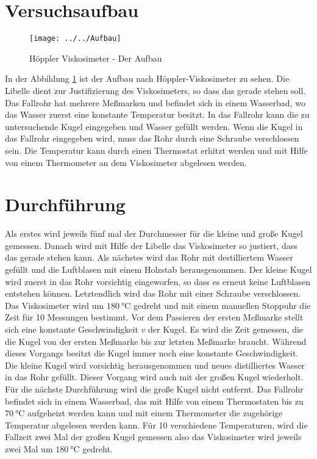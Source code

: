 \section{Versuchsaufbau}
\begin{figure}
	\centering
	\texttt{[image: ../../Aufbau]}
	\caption{Höppler Viskosimeter - Der Aufbau}
	\label{fig:aufbau}
\end{figure}
In der Abbildung \ref{fig:aufbau} ist der Aufbau nach Höppler-Viskosimeter zu sehen. Die Libelle dient zur Justifizierung des Viskosimeters, so dass das gerade stehen soll. Das Fallrohr hat mehrere Meßmarken und befindet sich in einem Wasserbad, wo das Wasser zuerst eine konstante Temperatur besitzt. In das Fallrohr kann die zu untersuchende Kugel eingegeben und Wasser gefüllt werden. Wenn die Kugel in das Fallrohr eingegeben wird, muss das Rohr durch eine Schraube verschlossen sein. Die Temperatur kann durch einen Thermostat erhitzt werden und mit Hilfe von einem Thermometer an dem Viskosimeter abgelesen werden.
\section{Durchführung}
\label{sec:Durchführung}
Als erstes wird jeweils fünf mal der Durchmesser für die kleine und große Kugel gemessen. Danach wird mit Hilfe der Libelle das Viskosimeter so justiert, dass das gerade stehen kann. Als nächstes wird das Rohr mit destilliertem Wasser gefüllt und die Luftblasen mit einem Holzstab herausgenommen. Der kleine Kugel wird zuerst in das Rohr vorsichtig eingeworfen, so dass es erneut keine Luftblasen entstehen können. Letztendlich wird das Rohr mit einer Schraube verschlossen. Das Viskosimeter wird um $\SI{180}{\degreeCelsius}$ gedreht und mit einem manuellen Stoppuhr die Zeit für 10 Messungen bestimmt. Vor dem Passieren der ersten Meßmarke stellt sich eine konstante Geschwindigkeit $v$ der Kugel. Es wird die Zeit gemessen, die die Kugel von der ersten Meßmarke bis zur letzten Meßmarke braucht. Während dieses Vorgangs besitzt die Kugel immer noch eine konstante Geschwindigkeit. Die kleine Kugel wird vorsichtig herausgenommen und neues distilliertes Wasser in das Rohr gefüllt. Dieser Vorgang wird auch mit der großen Kugel wiederholt. 
Für die nächste Durchführung wird die große Kugel nicht entfernt. Das Fallrohr befindet sich in einem Wasserbad, das mit Hilfe von einem Thermostaten bis zu $\SI{70}{\degreeCelsius}$ aufgeheizt werden kann und mit einem Thermometer die zugehörige Temperatur abgelesen werden kann. Für 10 verschiedene Temperaturen, wird die Fallzeit zwei Mal der großen Kugel gemessen also das Viskosimeter wird jeweils zwei Mal um $\SI{180}{\degreeCelsius}$ gedreht.
 